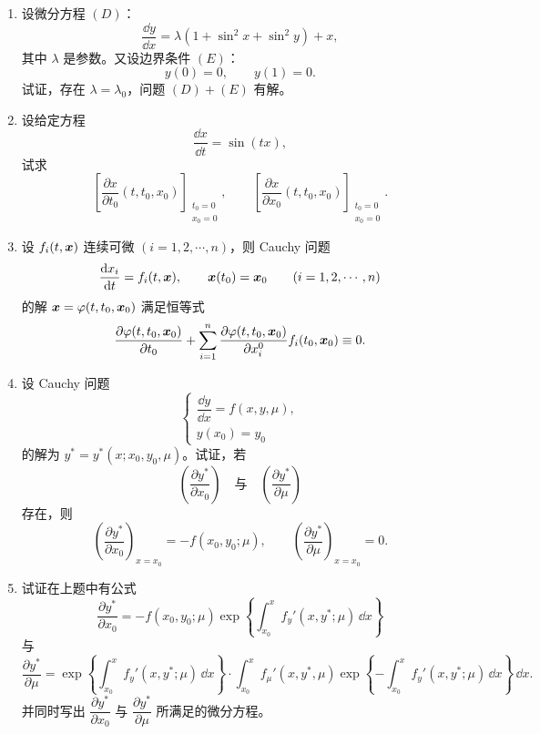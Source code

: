 \begin{enumerate}
\item 设微分方程 $(D)$：
\[
	\dfrac{\dd y}{\dd x}=\lambda(1+\sin^2x+\sin^2y)+x,
\]
其中 $\lambda$ 是参数。又设边界条件 $(E)$：
\[
	y(0)=0,\qquad y(1)=0.
\]
试证，存在 $\lambda=\lambda_0$，问题 $(D)+(E)$ 有解。

\item 设给定方程
\[
	\dfrac{\dd x}{\dd t}=\sin(tx),
\]
试求
\[
	\left[\dfrac{\partial x}{\partial t_0}(t,t_0,x_0)\right]_{\substack{t_0=0\\x_0=0}},
	\qquad
	\left[\dfrac{\partial x}{\partial x_0}(t,t_0,x_0)\right]_{\substack{t_0=0\\x_0=0}}.
\]

\item 设 $f_i(t,\boldsymbol{x})$ 连续可微 $(i=1,2,\cdots,n)$，则 Cauchy 问题
\[
	\dfrac{\mathrm{d} x_i}{\mathrm{d} t}=f_i(t,\boldsymbol{x}),\qquad
	\boldsymbol{x}(t_0)=\boldsymbol{x}_0\qquad(i=1,2,\cdots,n)
\]
的解 $\boldsymbol{x}=\varphi(t,t_0,\boldsymbol{x}_0)$ 满足恒等式
\[
	\dfrac{\partial\varphi(t,t_0,\boldsymbol{x}_0)}{\partial t_0}
	+\sum_{i=1}^n\dfrac{\partial\varphi(t,t_0,\boldsymbol{x}_0)}{\partial x_i^0}
	f_i(t_0,\boldsymbol{x}_0)\equiv0.
\]

\item 设 Cauchy 问题
\[
	\begin{cases}
		\dfrac{\dd y}{\dd x}=f(x,y,\mu),\\
		y(x_0)=y_0
	\end{cases}
\]
的解为 $y^*=y^*(x;x_0,y_0,\mu)$。试证，若
\[
	\left(\dfrac{\partial y^*}{\partial x_0}\right)
	\quad\text{与}\quad
	\left(\dfrac{\partial y^*}{\partial\mu}\right)
\]
存在，则
\[
	\left(\dfrac{\partial y^*}{\partial x_0}\right)_{x=x_0}
	=-f(x_0,y_0;\mu),\qquad
	\left(\dfrac{\partial y^*}{\partial\mu}\right)_{x=x_0}=0.
\]

\item 试证在上题中有公式
\[
	\dfrac{\partial y^*}{\partial x_0}
	=-f(x_0,y_0;\mu)
	\exp\!\left\{\int_{x_0}^x f_y'(x,y^*;\mu)\,\dd x\right\}
\]
与
\[
	\dfrac{\partial y^*}{\partial\mu}
	=\exp\!\left\{\int_{x_0}^x f_y'(x,y^*;\mu)\,\dd x\right\}
	\cdot\int_{x_0}^x f_\mu'(x,y^*,\mu)
	\exp\!\left\{-\int_{x_0}^x f_y'(x,y^*;\mu)\,\dd x\right\}\,\dd x.
\]
并同时写出 $\dfrac{\partial y^*}{\partial x_0}$ 与 $\dfrac{\partial y^*}{\partial\mu}$ 所满足的微分方程。


\end{enumerate}
